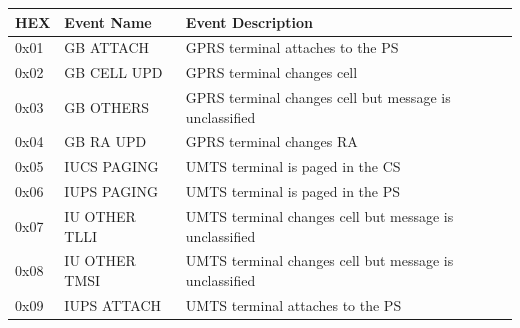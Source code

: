 \documentclass[master,english]{hgbthesis}
\begin{document}
{\small

	\begin{longtable}{|l|p{4cm}|p{8cm}|}

		\hline

		\textbf{HEX} & \textbf{ Event Name}                 & \textbf{Event Description}                                                                                 \\ \hline

		0x01         & GB ATTACH                            & GPRS terminal attaches to the PS                                                                           \\ \hline

		0x02         & GB CELL UPD                          & GPRS terminal changes cell                                                                                 \\ \hline

		0x03         & GB OTHERS                            & GPRS terminal changes cell but message is unclassified                                                     \\ \hline

		0x04         & GB RA UPD                            & GPRS terminal changes RA                                                                                   \\ \hline

		0x05         & IUCS PAGING                          & UMTS terminal is paged in the CS                                                                           \\ \hline

		0x06         & IUPS PAGING                          & UMTS terminal is paged in the PS                                                                           \\ \hline

		0x07         & IU OTHER TLLI                        & UMTS terminal changes cell but message is unclassified                                                     \\ \hline

		0x08         & IU OTHER TMSI                        & UMTS terminal changes cell but message is unclassified                                                     \\ \hline

		0x09         & IUPS ATTACH                          & UMTS terminal attaches to the PS                                                                           \\ \hline


\end{longtable}}
\end{document}

